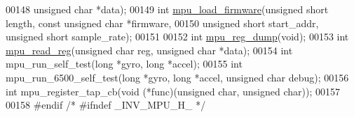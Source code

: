 \begin{DoxyCode}
00148     \textcolor{keywordtype}{unsigned} \textcolor{keywordtype}{char} *data);
00149 \textcolor{keywordtype}{int} \hyperlink{group___d_r_i_v_e_r_s_ga8fbdfe1a50285d4ab438e29c2efc70f5}{mpu\_load\_firmware}(\textcolor{keywordtype}{unsigned} \textcolor{keywordtype}{short} length, \textcolor{keyword}{const} \textcolor{keywordtype}{unsigned} \textcolor{keywordtype}{char} *firmware,
00150     \textcolor{keywordtype}{unsigned} \textcolor{keywordtype}{short} start\_addr, \textcolor{keywordtype}{unsigned} \textcolor{keywordtype}{short} sample\_rate);
00151 
00152 \textcolor{keywordtype}{int} \hyperlink{group___d_r_i_v_e_r_s_ga0e1201ecfd8453f1d89e4299528baaf6}{mpu\_reg\_dump}(\textcolor{keywordtype}{void});
00153 \textcolor{keywordtype}{int} \hyperlink{group___d_r_i_v_e_r_s_ga5c35a3363337014e11769a0ea7c0dfa9}{mpu\_read\_reg}(\textcolor{keywordtype}{unsigned} \textcolor{keywordtype}{char} reg, \textcolor{keywordtype}{unsigned} \textcolor{keywordtype}{char} *data);
00154 \textcolor{keywordtype}{int} mpu\_run\_self\_test(\textcolor{keywordtype}{long} *gyro, \textcolor{keywordtype}{long} *accel);
00155 \textcolor{keywordtype}{int} mpu\_run\_6500\_self\_test(\textcolor{keywordtype}{long} *gyro, \textcolor{keywordtype}{long} *accel, \textcolor{keywordtype}{unsigned} \textcolor{keywordtype}{char} debug);
00156 \textcolor{keywordtype}{int} mpu\_register\_tap\_cb(\textcolor{keywordtype}{void} (*func)(\textcolor{keywordtype}{unsigned} \textcolor{keywordtype}{char}, \textcolor{keywordtype}{unsigned} \textcolor{keywordtype}{char}));
00157 
00158 \textcolor{preprocessor}{#endif  }\textcolor{comment}{/* #ifndef \_INV\_MPU\_H\_ */}\textcolor{preprocessor}{}
\end{DoxyCode}
